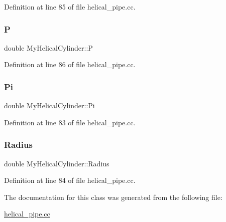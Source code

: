 Definition at line 85 of file helical\+\_\+pipe.\+cc.

\mbox{\label{classMyHelicalCylinder_a65f84ee526f6ff7fb20d6eb1f04e0bc7}} 
\subsubsection{\texorpdfstring{P}{P}}
{\footnotesize\ttfamily double My\+Helical\+Cylinder\+::P\hspace{0.3cm}{\ttfamily [private]}}



Definition at line 86 of file helical\+\_\+pipe.\+cc.

\mbox{\label{classMyHelicalCylinder_a15daea10a805c0564e89a1bf48fa964b}} 
\subsubsection{\texorpdfstring{Pi}{Pi}}
{\footnotesize\ttfamily double My\+Helical\+Cylinder\+::\+Pi\hspace{0.3cm}{\ttfamily [private]}}



Definition at line 83 of file helical\+\_\+pipe.\+cc.

\mbox{\label{classMyHelicalCylinder_af199ebf44d8ebb0dfbad5c0dadfff2a6}} 
\subsubsection{\texorpdfstring{Radius}{Radius}}
{\footnotesize\ttfamily double My\+Helical\+Cylinder\+::\+Radius\hspace{0.3cm}{\ttfamily [private]}}



Definition at line 84 of file helical\+\_\+pipe.\+cc.



The documentation for this class was generated from the following file\+:\begin{DoxyCompactItemize}
\item 
\hyperlink{helical__pipe_8cc}{helical\+\_\+pipe.\+cc}\end{DoxyCompactItemize}
